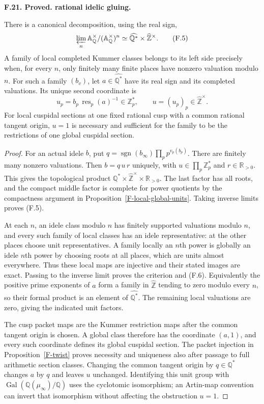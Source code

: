 \documentclass[11pt,oneside]{article}
\makeatletter
\newcounter{statementanchor}
\newenvironment{statement}[3]{%
 \refstepcounter{statementanchor}\def\@currentlabel{#1}%
 \par\addvspace{9pt}\noindent
 \textbf{#1. #2. #3.}\par\nobreak\noindent\ignorespaces
}{\par\addvspace{5pt}}
\makeatother
\begin{document}
\begin{statement}{F.21}{Proved}{rational idelic gluing}
\label{st:F.21}
\label{F-ideles}
There is a canonical decomposition, using the real sign,
\[
 \varprojlim_n\mathbb A_{\mathbb Q}^{\times}/
                   (\mathbb A_{\mathbb Q}^{\times})^n
 \simeq\widehat{\mathbb Q^*}\times\widehat{\mathbb Z}^{\times}.
                                                                  \tag{F.5}
\]
A family of local completed Kummer classes belongs to its left
side precisely when, for every $n$, only finitely many finite
places have nonzero valuation modulo $n$. For such a family
$(b_v)$, let $a\in\widehat{\mathbb Q^*}$ have its real sign
and its completed valuations. Its unique second coordinate is
\[
 u_p=b_p\,\operatorname{res}_p(a)^{-1}\in\mathbb Z_p^*,
 \qquad u=(u_p)_p\in\widehat{\mathbb Z}^{\times}.             \tag{F.6}
\]
For local cuspidal sections at one fixed rational cusp with a
common rational tangent origin, $u=1$ is necessary and sufficient
for the family to be the restrictions of one global cuspidal
section.
\end{statement}
\begin{proof}
For an actual idele $b$, put
$q=\operatorname{sgn}(b_\infty)\prod_p p^{v_p(b_p)}$.
There are finitely many nonzero valuations. Then
$b=q\,u\,r$ uniquely, with $u\in\prod_p\mathbb Z_p^*$
and $r\in\mathbb R_{>0}$. This gives the topological product
$\mathbb Q^*\times\widehat{\mathbb Z}^{\times}\times
\mathbb R_{>0}$. The last factor has all roots, and the compact
middle factor is complete for power quotients by the compactness
argument in Proposition~\ref{F-local-global-units}. Taking
inverse limits proves (F.5).

At each $n$, an idele class modulo $n$ has finitely supported
valuations modulo $n$, and every such family of local classes
has an idele representative: at the other places choose unit
representatives. A family locally an $n$th power is globally an
idele $n$th power by choosing roots at all places, which are
units almost everywhere. Thus these local maps are injective
and their stated images are exact. Passing to the inverse limit
proves the criterion and (F.6). Equivalently the positive prime
exponents of $a$ form a family in $\widehat{\mathbb Z}$ tending
to zero modulo every $n$, so their formal product is an element
of $\widehat{\mathbb Q^*}$. The remaining local valuations are
zero, giving the indicated unit factors.

The cusp packet maps are the Kummer restriction maps after the
common tangent origin is chosen. A global class therefore has
the coordinate $(a,1)$, and every such coordinate defines its
global cuspidal section. The packet injection in
Proposition~\ref{F-twist} proves necessity and uniqueness also
after passage to full arithmetic section classes. Changing the
common tangent origin by $q\in\mathbb Q^*$ changes $a$ by $q$
and leaves $u$ unchanged. Identifying this unit group with
$\operatorname{Gal}(\mathbb Q(\mu_\infty)/\mathbb Q)$ uses
the cyclotomic isomorphism; an Artin-map convention can invert
that isomorphism without affecting the obstruction $u=1$.
\end{proof}
\end{document}
